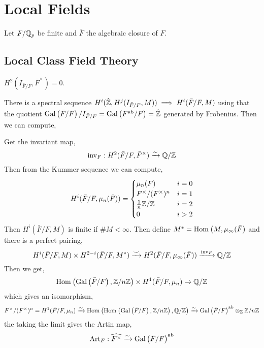 \documentclass[12pt]{article}
\begin{document}
\section{Local Fields}

Let $F / \mathbb{Q}_p$ be finite and $\bar{F}$ the algebraic closure of $F$.  


\subsection{Local Class Field Theory}

\newcommand{\nr}{\mathrm{nr}}
\newcommand{\Art}{\mathrm{Art}}

$H^2(I_{\bar{F}/F}, \bar{F}^\times) = 0$.


There is a spectral sequence $H^i(\hat{\mathbb{Z}}, H^j(I_{\bar{F}/F}, M)) \implies H^i(\bar{F}/F, M)$ using that the quotient $\mathrm{Gal}\left( \bar{F}/F \right) / I_{\bar{F}/F} = \mathrm{Gal}\left( F^{\mathrm{ab}} / F \right) = \hat{\mathbb{Z}}$ generated by Frobenius. Then we can compute,

\begin{center}
\end{center}
Get the invariant map,
\[ \mathrm{inv}_F : H^2(\bar{F} / F, \bar{F}^\times) \xrightarrow{\sim} \mathbb{Q} / \mathbb{Z} \]
Then from the Kummer sequence we can compute,
\[ H^i(\bar{F} / F, \mu_n(\bar{F})) = \begin{cases}
\mu_n(F) & i = 0
\\
F^\times / (F^\times)^n & i = 1
\\
\frac{1}{n} \mathbb{Z} / \mathbb{Z} & i = 2
\\
0 & i > 2
\end{cases} \]
Then $H^i(\bar{F} / F, M)$ is finite if $\# M < \infty$. Then define $M^* = \mathrm{Hom}_{} \left( M, \mu_{\infty}(\bar{F} \right)$ and there is a perfect pairing,
\[ H^i(\bar{F} / F, M) \times H^{2 - i}(\bar{F} / F, M^*) \xrightarrow{\smile} H^2(\bar{F} / F, \mu_{\infty}(\bar{F})) \xrightarrow{\mathrm{inv}_F} \mathbb{Q} / \mathbb{Z} \] 
Then we get,
\[ \mathrm{Hom}_{} \left( \mathrm{Gal}\left( \bar{F}/F \right), \mathbb{Z} / n \mathbb{Z} \right) \times H^1(\bar{F} / F, \mu_n) \to \mathbb{Q} / \mathbb{Z} \]
which gives an isomorphism,
\[  F^\times / (F^\times)^n = H^1(\bar{F} / F, \mu_n) \xrightarrow{\sim} \mathrm{Hom}_{} \left( \mathrm{Hom}_{} \left( \mathrm{Gal}\left( \bar{F}/F \right), \mathbb{Z} / n \mathbb{Z} \right), \mathbb{Q}/\mathbb{Z} \right) \xrightarrow{\sim} \mathrm{Gal}\left( \bar{F} / F \right)^{\mathrm{ab}} \otimes_{\mathbb{Z}} \mathbb{Z} / n \mathbb{Z} \]
the taking the limit gives the Artin map,
\[ \Art_F : \widehat{F^\times} \iso \Gal{\bar{F} / F}^\ab \]
\end{document}
